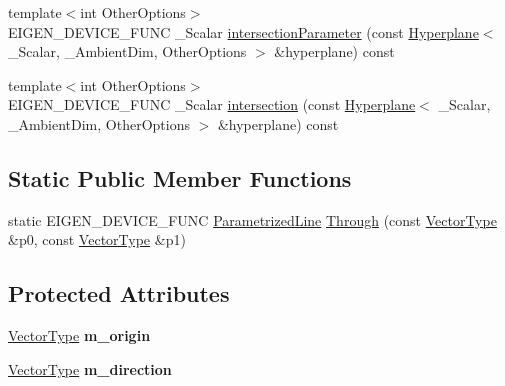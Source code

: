 \begin{DoxyCompactItemize}
\item 
{\footnotesize template$<$int Other\+Options$>$ }\\E\+I\+G\+E\+N\+\_\+\+D\+E\+V\+I\+C\+E\+\_\+\+F\+U\+NC \+\_\+\+Scalar \mbox{\hyperlink{class_eigen_1_1_parametrized_line_ad476025bb806ab3c8fd14d2381139dbc}{intersection\+Parameter}} (const \mbox{\hyperlink{class_eigen_1_1_hyperplane}{Hyperplane}}$<$ \+\_\+\+Scalar, \+\_\+\+Ambient\+Dim, Other\+Options $>$ \&hyperplane) const
\item 
{\footnotesize template$<$int Other\+Options$>$ }\\E\+I\+G\+E\+N\+\_\+\+D\+E\+V\+I\+C\+E\+\_\+\+F\+U\+NC \+\_\+\+Scalar \mbox{\hyperlink{class_eigen_1_1_parametrized_line_a512be7d79c7c982380e59ddf84d61252}{intersection}} (const \mbox{\hyperlink{class_eigen_1_1_hyperplane}{Hyperplane}}$<$ \+\_\+\+Scalar, \+\_\+\+Ambient\+Dim, Other\+Options $>$ \&hyperplane) const
\end{DoxyCompactItemize}
\subsection*{Static Public Member Functions}
\begin{DoxyCompactItemize}
\item 
static E\+I\+G\+E\+N\+\_\+\+D\+E\+V\+I\+C\+E\+\_\+\+F\+U\+NC \mbox{\hyperlink{class_eigen_1_1_parametrized_line}{Parametrized\+Line}} \mbox{\hyperlink{class_eigen_1_1_parametrized_line_a79fec5983b16b02100d67c81407e96fa}{Through}} (const \mbox{\hyperlink{class_eigen_1_1_matrix}{Vector\+Type}} \&p0, const \mbox{\hyperlink{class_eigen_1_1_matrix}{Vector\+Type}} \&p1)
\end{DoxyCompactItemize}
\subsection*{Protected Attributes}
\begin{DoxyCompactItemize}
\item 
\mbox{\label{class_eigen_1_1_parametrized_line_af1f2dfe6917701c64633e50ae83692d7}} 
\mbox{\hyperlink{class_eigen_1_1_matrix}{Vector\+Type}} {\bfseries m\+\_\+origin}
\item 
\mbox{\label{class_eigen_1_1_parametrized_line_a37368bd3f68f8a5d2a5014d94c80dd6d}} 
\mbox{\hyperlink{class_eigen_1_1_matrix}{Vector\+Type}} {\bfseries m\+\_\+direction}
\end{DoxyCompactItemize}


